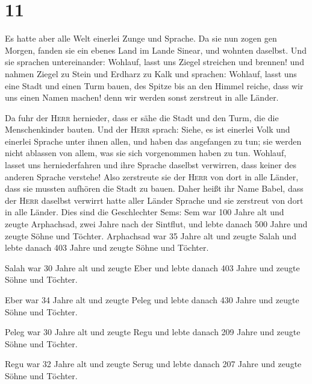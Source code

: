 \hypertarget{section-10}{%
\section{11}\label{section-10}}

 Es hatte aber alle Welt einerlei Zunge und Sprache.
 Da sie nun zogen gen Morgen, fanden sie ein ebenes Land
im Lande Sinear, und wohnten daselbst.  Und sie sprachen
untereinander: Wohlauf, lasst uns Ziegel streichen und brennen! und
nahmen Ziegel zu Stein und Erdharz zu Kalk  und sprachen:
Wohlauf, lasst uns eine Stadt und einen Turm bauen, des Spitze bis an
den Himmel reiche, dass wir uns einen Namen machen! denn wir werden
sonst zerstreut in alle Länder.

 Da fuhr der \textsc{Herr} hernieder, dass er sähe die
Stadt und den Turm, die die Menschenkinder bauten.  Und
der \textsc{Herr} sprach: Siehe, es ist einerlei Volk und einerlei
Sprache unter ihnen allen, und haben das angefangen zu tun; sie werden
nicht ablassen von allem, was sie sich vorgenommen haben zu tun.
 Wohlauf, lasset uns herniederfahren und ihre Sprache
daselbst verwirren, dass keiner des anderen Sprache verstehe!
 Also zerstreute sie der \textsc{Herr} von dort in alle
Länder, dass sie mussten aufhören die Stadt zu bauen. 
Daher heißt ihr Name Babel, dass der \textsc{Herr} daselbst verwirrt
hatte aller Länder Sprache und sie zerstreut von dort in alle Länder.
 Dies sind die Geschlechter Sems: Sem war 100 Jahre alt
und zeugte Arphachsad, zwei Jahre nach der Sintflut,  und
lebte danach 500 Jahre und zeugte Söhne und Töchter. 
Arphachsad war 35 Jahre alt und zeugte Salah  und lebte
danach 403 Jahre und zeugte Söhne und Töchter.

 Salah war 30 Jahre alt und zeugte Eber 
und lebte danach 403 Jahre und zeugte Söhne und Töchter.

 Eber war 34 Jahre alt und zeugte Peleg 
und lebte danach 430 Jahre und zeugte Söhne und Töchter.

 Peleg war 30 Jahre alt und zeugte Regu 
und lebte danach 209 Jahre und zeugte Söhne und Töchter.

 Regu war 32 Jahre alt und zeugte Serug 
und lebte danach 207 Jahre und zeugte Söhne und Töchter.

